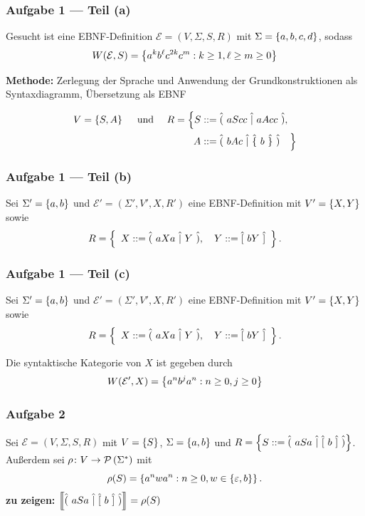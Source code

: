 \documentclass{beamer}
\newcommand{\sem}[1]{\left\llbracket #1 \right\rrbracket}
\begin{document}
\begin{frame} \frametitle{Aufgabe 1 --- Teil (a)}
	Gesucht ist eine EBNF-Definition $\mathcal{E} = (V,\Sigma, S, R)$ mit $\Sigma = \left\{ a,b,c,d \right\}$, sodass 
	\begin{equation*}
		W(\mathcal{E}, S) = \left\{ a^k b^\ell c^{2k} c^m : k \ge 1, \ell \ge m \ge 0 \right\}
	\end{equation*}

	\pause
	
	\textbf{Methode:} Zerlegung der Sprache und Anwendung der Grundkonstruktionen als Syntaxdiagramm, Übersetzung als EBNF
	
	\pause
	
	\begin{align*}
		V = \left\{ S,A \right\} \quad \text{ und } \quad
		R = \Big\{ 
		S &::= \hat{(} \  a S cc  \ \hat{|} \  a A cc  \ \hat{)}, \\
		A &::= \hat{(} \ b A c \ \hat{|} \  \hat{\{} \ b \ \hat{\}}  \ \hat{)} \quad 
		\Big\}
	\end{align*}
\end{frame}

\begin{frame}[t] \frametitle{Aufgabe 1 --- Teil (b)}
	Sei $\Sigma' = \left\{ a, b \right\}$ und $\mathcal{E}' = (\Sigma', V', X, R')$ eine EBNF-Definition mit $V' = \left\{ X,Y \right\}$ sowie
	\begin{equation*}
		R = \left\{  \enskip X ::= \hat{(} \ aXa \ \hat{|} \ Y \ \hat{)}, \quad Y ::= \hat{[} \ bY \ \hat{]} \enskip \right\} .
	\end{equation*}
	
	
\end{frame}

\begin{frame}[t] \frametitle{Aufgabe 1 --- Teil (c)}
	Sei $\Sigma' = \left\{ a, b \right\}$ und $\mathcal{E}' = (\Sigma', V', X, R')$ eine EBNF-Definition mit $V' = \left\{ X,Y \right\}$ sowie
	\begin{equation*}
	R = \left\{  \enskip X ::= \hat{(} \ aXa \ \hat{|} \ Y \ \hat{)}, \quad Y ::= \hat{[} \ bY \ \hat{]} \enskip \right\} .
	\end{equation*}
	\pause
	
	Die syntaktische Kategorie von $X$ ist gegeben durch
	\begin{equation*}
		W(\mathcal{E}', X) = \left\{ a^n b^j a^n : n \ge 0, j \ge 0 \right\}
	\end{equation*}
\end{frame}

\begin{frame}[t] \frametitle{Aufgabe 2}
	Sei $\mathcal{E} = (V, \Sigma, S, R)$ mit $V = \left\{ S \right\}$, $\Sigma = \left\{ a,b \right\}$ und $R = \left\{ S ::= \hat{(} \ aSa \ \hat{|} \ \hat{[} \ b \ \hat{]} \ \hat{)} \right\}$. Außerdem sei $\rho \colon V \to \mathcal{P}\left( \Sigma^\ast \right)$ mit
	\begin{equation*}
		\rho(S) = \left\{ a^n w a^n : n \ge 0, w \in \left\{ \varepsilon, b \right\} \right\}.
	\end{equation*}
	\textbf{zu zeigen:} $\sem{\opt{aSa}{\byp{b}}} = \rho(S)$
\end{frame}
\end{document}
